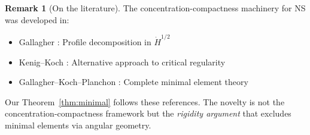 \documentclass[11pt]{article}
\theoremstyle{definition}
\newtheorem{remark}[theorem]{Remark}
\begin{document}
\begin{remark}[On the literature]
The concentration-compactness machinery for NS was developed in:
\begin{itemize}
\item Gallagher \cite{Gallagher2001}: Profile decomposition in $\dot{H}^{1/2}$
\item Kenig--Koch \cite{KenigKoch}: Alternative approach to critical regularity
\item Gallagher--Koch--Planchon \cite{GKP, GKP2016}: Complete minimal element theory
\end{itemize}
Our Theorem~\ref{thm:minimal} follows these references. The novelty is not the concentration-compactness framework but the \emph{rigidity argument} that excludes minimal elements via angular geometry.
\end{remark}
\end{document}
